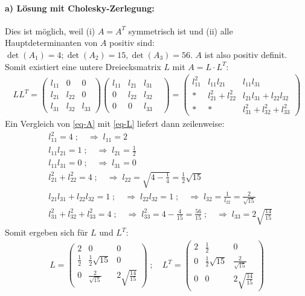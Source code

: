 \paragraph*{a) Lösung mit Cholesky-Zerlegung:}
Dies ist möglich, weil (i) $A = A^T$ symmetrisch ist und (ii) alle
Hauptdeterminanten von $A$ positiv sind:
$\det (A_1) = 4; \det (A_2) = 15, \det(A_3) = 56$. $A$ ist also positiv definit.
Somit existiert eine untere Dreiecksmatrix $L$ mit $A = L \cdot L^T$:
\begin{align}
\label{eq-L}
  L L^T = \begin{pmatrix}l_{11}&0&0\\l_{21}&l_{22}&0\\l_{31}&l_{32}&l_{33}\end{pmatrix}
  \begin{pmatrix}l_{11}&l_{21}&l_{31}\\0 &l_{22}&l_{32}\\0&0&l_{33}&\end{pmatrix} =
  \begin{pmatrix}l_{11}^2&l_{11}l_{21}&l_{11}l_{31}\\
  *&l_{21}^2+l_{22}^2&l_{21}l_{31}+l_{22}l_{32}\\
  *&*&l_{31}^2+l_{32}^2+l_{33}^2\end{pmatrix}
\end{align}
Ein Vergleich von \eqref{eq-A} mit \eqref{eq-L} liefert dann zeilenweise:
\begin{align*}
  & l_{11}^2 = 4 \;;\quad\Rightarrow\; l_{11} = 2\\
  & l_{11}l_{21} = 1 \;;\quad\Rightarrow\; l_{21} = \frac{1}{2}\\
  & l_{11}l_{31} = 0  \;;\quad\Rightarrow\;l_{31} = 0\\
  & l_{21}^2+l_{22}^2 = 4 \;;\quad\Rightarrow\; l_{22} = \sqrt{4 -\frac{1}{4}} = \frac{1}{2}\sqrt{15}\\
  & l_{21}l_{31}+l_{22}l_{32} = 1 \;;\quad\Rightarrow\; l_{22}l_{32} = 1
  \;;\quad\Rightarrow\; l_{32} = \frac{1}{l_{22}} = \frac{2}{\sqrt{15}}\\
  &l_{31}^2+l_{32}^2+l_{33}^2 = 4 \;;\quad\Rightarrow\;l_{33}^2 = 4 -\frac{4}{15} = \frac{56}{15}
  \;;\quad\Rightarrow\;l_{33} = 2 \sqrt{\frac{14}{15}}
\end{align*}
Somit ergeben sich für $L$ und $L^T$:
\begin{align}
L = \begin{pmatrix}2 & 0 & 0 \\
       \frac{1}{2} & \frac{1}{2}\sqrt{15} & 0 \\
       0 & \frac{2}{\sqrt{15}} &  2 \sqrt{\frac{14}{15}} \end{pmatrix} \; ;\quad
L^T = \begin{pmatrix}2 & \frac{1}{2} & 0 \\
      0 & \frac{1}{2}\sqrt{15} & \frac{2}{\sqrt{15}} \\
      0 & 0& 2 \sqrt{\frac{14}{15}}\end{pmatrix}
\end{align}
